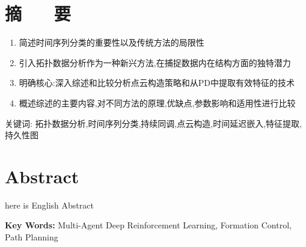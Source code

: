 \section*{ \centering 摘 ~~ 要}
 \begin{enumerate}
 \item 简述时间序列分类的重要性以及传统方法的局限性
 \item 引入拓扑数据分析作为一种新兴方法,在捕捉数据内在结构方面的独特潜力
 \item 明确核心:深入综述和比较分析点云构造策略和从PD中提取有效特征的技术
 \item 概述综述的主要内容,对不同方法的原理,优缺点,参数影响和适用性进行比较
 
 \end{enumerate}





\vskip0.5cm

{ \heiti 关键词: } 拓扑数据分析,时间序列分类,持续同调,点云构造,时间延迟嵌入,特征提取,持久性图

\clearpage
\section*{ \centering \textbf{Abstract} }
   
here is English Abstract

\vskip0.5cm

\textbf{ Key Words:} Multi-Agent Deep Reinforcement Learning, Formation Control, Path Planning




